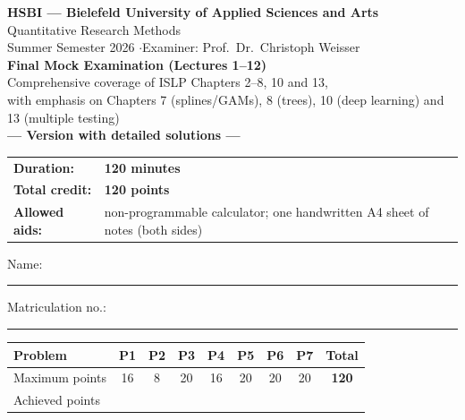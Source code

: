 \documentclass[11pt,a4paper]{article}
\begin{document}
\begin{center}
  {\Large\textbf{HSBI --- Bielefeld University of Applied Sciences and Arts}}\\[1.2mm]
  {\large Quantitative Research Methods}\\[1mm]
  {\normalsize Summer Semester 2026 \quad$\cdot$\quad Examiner: Prof.\ Dr.\ Christoph Weisser}\\[4.5mm]
  {\LARGE\textbf{Final Mock Examination (Lectures 1--12)}}\\[1.2mm]
  {\normalsize Comprehensive coverage of ISLP Chapters 2--8, 10 and 13,\\
   with emphasis on Chapters 7 (splines/GAMs), 8 (trees), 10 (deep learning) and 13 (multiple testing)}%
  \ifdefined\withsolutions\\[2.2mm]{\large\textcolor{teal!55!black}{\textbf{--- Version with detailed solutions ---}}}\fi
\end{center}

\vspace{2.5mm}
\begin{center}
\begin{tabular}{@{}ll@{}}
  \textbf{Duration:} & \textbf{120 minutes}\\
  \textbf{Total credit:} & \textbf{120 points}\\
  \textbf{Allowed aids:} & non-programmable calculator; one handwritten A4 sheet of notes (both sides)\\
\end{tabular}
\end{center}

\vspace{3mm}
Name: \rule[-1mm]{0.38\textwidth}{0.4pt}\hfill Matriculation no.: \rule[-1mm]{0.24\textwidth}{0.4pt}

\vspace{4.5mm}
\begin{center}
\renewcommand{\arraystretch}{1.35}
\begin{tabular}{|l|c|c|c|c|c|c|c|c|}
\hline
\textbf{Problem} & \textbf{P1} & \textbf{P2} & \textbf{P3} & \textbf{P4} & \textbf{P5} & \textbf{P6} & \textbf{P7} & \textbf{Total}\\\hline
Maximum points & 16 & 8 & 20 & 16 & 20 & 20 & 20 & \textbf{120}\\\hline
Achieved points & \hspace{8mm} & \hspace{8mm} & \hspace{8mm} & \hspace{8mm} & \hspace{8mm} & \hspace{8mm} & \hspace{8mm} & \hspace{10mm}\\\hline
\end{tabular}
\end{center}
\end{document}
